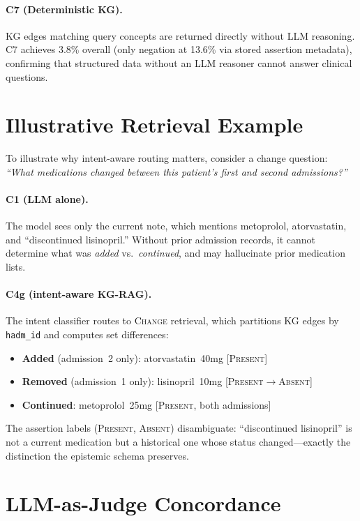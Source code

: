 \paragraph{C7 (Deterministic KG).}
KG edges matching query concepts are returned directly without LLM reasoning.
C7 achieves 3.8\% overall (only negation at 13.6\% via stored assertion metadata), confirming that structured data without an LLM reasoner cannot answer clinical questions.


\section{Illustrative Retrieval Example}
\label{app:example}

To illustrate why intent-aware routing matters, consider a change question: \emph{``What medications changed between this patient's first and second admissions?''}

\paragraph{C1 (LLM alone).}
The model sees only the current note, which mentions metoprolol, atorvastatin, and ``discontinued lisinopril.'' Without prior admission records, it cannot determine what was \emph{added} vs.\ \emph{continued}, and may hallucinate prior medication lists.

\paragraph{C4g (intent-aware KG-RAG).}
The intent classifier routes to \textsc{Change} retrieval, which partitions KG edges by \texttt{hadm\_id} and computes set differences:
\begin{itemize}[nosep,leftmargin=1.5em]
\item \textbf{Added} (admission~2 only): atorvastatin~40mg [\textsc{Present}]
\item \textbf{Removed} (admission~1 only): lisinopril~10mg [\textsc{Present}$\to$\textsc{Absent}]
\item \textbf{Continued}: metoprolol~25mg [\textsc{Present}, both admissions]
\end{itemize}
The assertion labels (\textsc{Present}, \textsc{Absent}) disambiguate: ``discontinued lisinopril'' is not a current medication but a historical one whose status changed---exactly the distinction the epistemic schema preserves.


\section{LLM-as-Judge Concordance}
\label{app:llm_judge}

